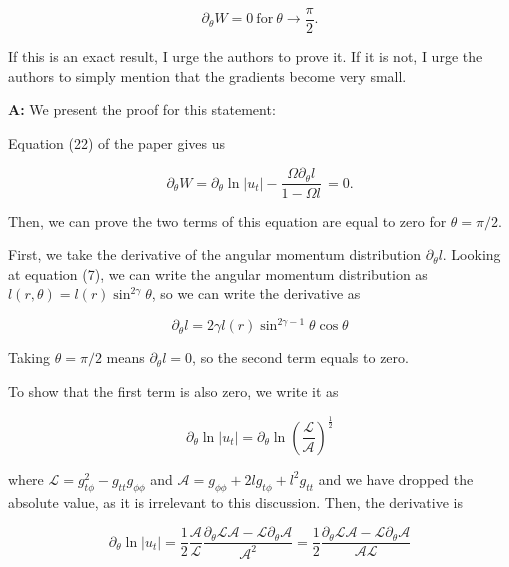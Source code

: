 \documentclass{article}
\begin{document}
\begin{equation}
\partial_{\theta} W = 0 \ \mathrm{for} \ \theta \rightarrow \frac{\pi}{2}.
\end{equation}

If this is an exact result, I urge the authors to prove it. If it is
not, I urge the authors to simply mention that the gradients become
very small.

\bigskip

{\bf A:} We present the proof for this statement:

Equation (22) of the paper gives us

\begin{equation}
\partial_{\theta} W = \partial_{\theta} \ln|u_t| - \frac{\Omega \partial_{\theta}l}{1 - \Omega l}\, = 0.
\end{equation}

Then, we can prove the two terms of this equation are equal to zero for $\theta = \pi/2$.

First, we take the derivative of the angular momentum distribution $\partial_{\theta} l$. Looking at equation (7), we can write the angular momentum distribution as $l(r, \theta) = l(r) \sin^{2\gamma} \theta$, so we can write the derivative as

\begin{equation}
\partial_{\theta} l = 2\gamma l(r) \sin^{2\gamma - 1} \theta \cos \theta
\end{equation}

Taking $\theta = \pi/2$ means $\partial_{\theta} l = 0$, so the second term equals to zero.

To show that the first term is also zero, we write it as

\begin{equation}
\partial_{\theta} \ln|u_t| = \partial_{\theta} \ln \left(\frac{\mathcal{L}}{\mathcal{A}}\right)^{\frac{1}{2}}
\end{equation}

where $\mathcal{L} = g_{t \phi}^2 - g_{tt} g_{\phi\phi}$ and $\mathcal{A} = g_{\phi\phi} + 2 l g_{t\phi} + l^2g_{tt}$ and we have dropped the absolute value, as it is irrelevant to this discussion. Then, the derivative is

\begin{equation}
\partial_{\theta} \ln|u_t| = \frac{1}{2} \frac{\mathcal{A}}{\mathcal{L}}\frac{\partial_{\theta}{\mathcal{L}}\mathcal{A} - \mathcal{L}\partial_{\theta}\mathcal{A}}{\mathcal{A}^2} = \frac{1}{2} \frac{\partial_{\theta}{\mathcal{L}}\mathcal{A} - \mathcal{L}\partial_{\theta}\mathcal{A}}{\mathcal{A} \mathcal{L}}
\end{equation}
\end{document}
